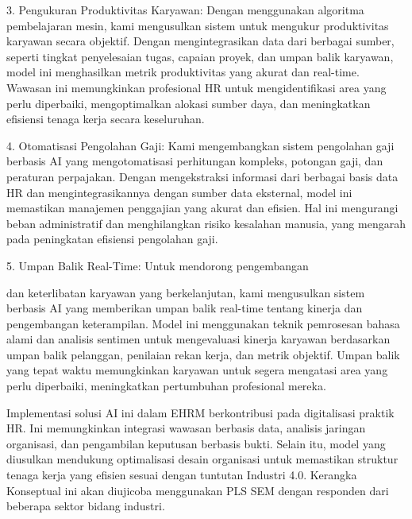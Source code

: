 \documentclass[12pt]{article}
\begin{document}
3. Pengukuran Produktivitas Karyawan:
Dengan menggunakan algoritma pembelajaran mesin, kami mengusulkan sistem untuk mengukur produktivitas karyawan secara objektif. Dengan mengintegrasikan data dari berbagai sumber, seperti tingkat penyelesaian tugas, capaian proyek, dan umpan balik karyawan, model ini menghasilkan metrik produktivitas yang akurat dan real-time. Wawasan ini memungkinkan profesional HR untuk mengidentifikasi area yang perlu diperbaiki, mengoptimalkan alokasi sumber daya, dan meningkatkan efisiensi tenaga kerja secara keseluruhan.

4. Otomatisasi Pengolahan Gaji:
Kami mengembangkan sistem pengolahan gaji berbasis AI yang mengotomatisasi perhitungan kompleks, potongan gaji, dan peraturan perpajakan. Dengan mengekstraksi informasi dari berbagai basis data HR dan mengintegrasikannya dengan sumber data eksternal, model ini memastikan manajemen penggajian yang akurat dan efisien. Hal ini mengurangi beban administratif dan menghilangkan risiko kesalahan manusia, yang mengarah pada peningkatan efisiensi pengolahan gaji.

5. Umpan Balik Real-Time:
Untuk mendorong pengembangan

 dan keterlibatan karyawan yang berkelanjutan, kami mengusulkan sistem berbasis AI yang memberikan umpan balik real-time tentang kinerja dan pengembangan keterampilan. Model ini menggunakan teknik pemrosesan bahasa alami dan analisis sentimen untuk mengevaluasi kinerja karyawan berdasarkan umpan balik pelanggan, penilaian rekan kerja, dan metrik objektif. Umpan balik yang tepat waktu memungkinkan karyawan untuk segera mengatasi area yang perlu diperbaiki, meningkatkan pertumbuhan profesional mereka.

Implementasi solusi AI ini dalam EHRM berkontribusi pada digitalisasi praktik HR. Ini memungkinkan integrasi wawasan berbasis data, analisis jaringan organisasi, dan pengambilan keputusan berbasis bukti. Selain itu, model yang diusulkan mendukung optimalisasi desain organisasi untuk memastikan struktur tenaga kerja yang efisien sesuai dengan tuntutan Industri 4.0. Kerangka Konseptual ini akan diujicoba menggunakan PLS SEM dengan responden dari beberapa sektor bidang industri.
\end{document}
